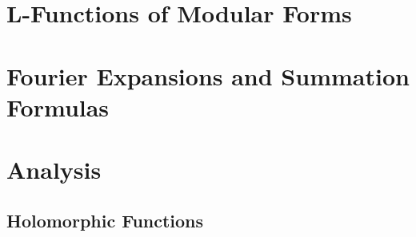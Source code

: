 

\section{L-Functions of Modular Forms}



\section{Fourier Expansions and Summation Formulas}









\appendix
\section{Analysis}

\subsection{Holomorphic Functions}











